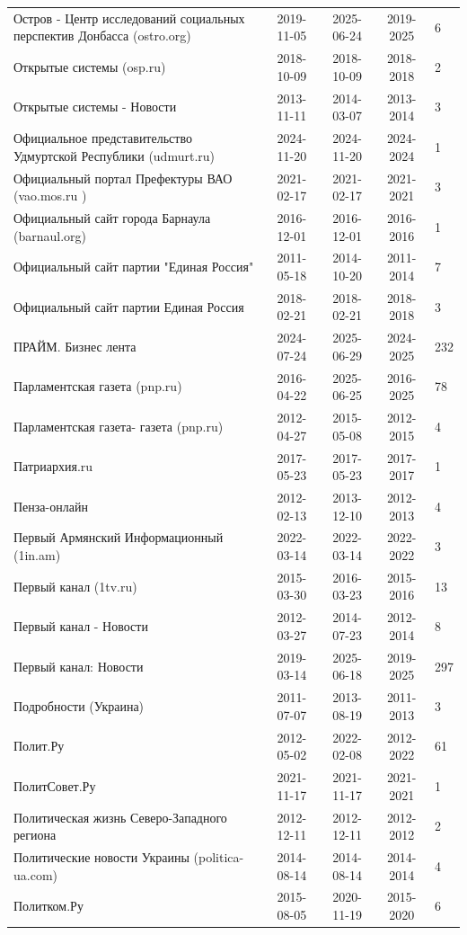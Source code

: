 \begin{longtable}{p{6cm}cccp{2cm}}
Остров - Центр исследований социальных перспектив Донбасса (ostro.org) & 2019-11-05 & 2025-06-24 & 2019-2025 & 6\\
Открытые системы (osp.ru) & 2018-10-09 & 2018-10-09 & 2018-2018 & 2\\
Открытые системы - Новости & 2013-11-11 & 2014-03-07 & 2013-2014 & 3\\
Официальное представительство Удмуртской Республики (udmurt.ru) & 2024-11-20 & 2024-11-20 & 2024-2024 & 1\\
Официальный портал Префектуры ВАО (vao.mos.ru ) & 2021-02-17 & 2021-02-17 & 2021-2021 & 3\\
Официальный сайт города Барнаула (barnaul.org) & 2016-12-01 & 2016-12-01 & 2016-2016 & 1\\
Официальный сайт партии "Единая Россия" & 2011-05-18 & 2014-10-20 & 2011-2014 & 7\\
Официальный сайт партии Единая Россия & 2018-02-21 & 2018-02-21 & 2018-2018 & 3\\
ПРАЙМ. Бизнес лента & 2024-07-24 & 2025-06-29 & 2024-2025 & 232\\
Парламентская газета (pnp.ru) & 2016-04-22 & 2025-06-25 & 2016-2025 & 78\\
Парламентская газета- газета (pnp.ru) & 2012-04-27 & 2015-05-08 & 2012-2015 & 4\\
Патриархия.ru & 2017-05-23 & 2017-05-23 & 2017-2017 & 1\\
Пенза-онлайн & 2012-02-13 & 2013-12-10 & 2012-2013 & 4\\
Первый Армянский Информационный (1in.am) & 2022-03-14 & 2022-03-14 & 2022-2022 & 3\\
Первый канал (1tv.ru) & 2015-03-30 & 2016-03-23 & 2015-2016 & 13\\
Первый канал - Новости & 2012-03-27 & 2014-07-23 & 2012-2014 & 8\\
Первый канал: Новости & 2019-03-14 & 2025-06-18 & 2019-2025 & 297\\
Подробности (Украина) & 2011-07-07 & 2013-08-19 & 2011-2013 & 3\\
Полит.Ру & 2012-05-02 & 2022-02-08 & 2012-2022 & 61\\
ПолитСовет.Ру & 2021-11-17 & 2021-11-17 & 2021-2021 & 1\\
Политическая жизнь Северо-Западного региона & 2012-12-11 & 2012-12-11 & 2012-2012 & 2\\
Политические новости Украины (politica-ua.com) & 2014-08-14 & 2014-08-14 & 2014-2014 & 4\\
Политком.Ру & 2015-08-05 & 2020-11-19 & 2015-2020 & 6\\

\end{longtable}
